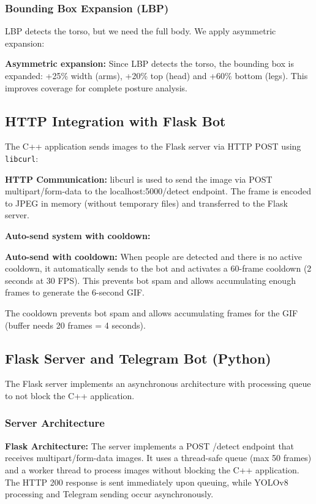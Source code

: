 \documentclass[conference]{IEEEtran}
\begin{document}
\subsubsection{Bounding Box Expansion (LBP)}

LBP detects the torso, but we need the full body. We apply asymmetric expansion:

\textbf{Asymmetric expansion:} Since LBP detects the torso, the bounding box is expanded: +25\% width (arms), +20\% top (head) and +60\% bottom (legs). This improves coverage for complete posture analysis.

\subsection{HTTP Integration with Flask Bot}

The C++ application sends images to the Flask server via HTTP POST using \texttt{libcurl}:

\textbf{HTTP Communication:} libcurl is used to send the image via POST multipart/form-data to the localhost:5000/detect endpoint. The frame is encoded to JPEG in memory (without temporary files) and transferred to the Flask server.

\textbf{Auto-send system with cooldown:}

\textbf{Auto-send with cooldown:} When people are detected and there is no active cooldown, it automatically sends to the bot and activates a 60-frame cooldown (2 seconds at 30 FPS). This prevents bot spam and allows accumulating enough frames to generate the 6-second GIF.

The cooldown prevents bot spam and allows accumulating frames for the GIF (buffer needs 20 frames = 4 seconds).

\subsection{Flask Server and Telegram Bot (Python)}

The Flask server implements an asynchronous architecture with processing queue to not block the C++ application.

\subsubsection{Server Architecture}

\textbf{Flask Architecture:} The server implements a POST /detect endpoint that receives multipart/form-data images. It uses a thread-safe queue (max 50 frames) and a worker thread to process images without blocking the C++ application. The HTTP 200 response is sent immediately upon queuing, while YOLOv8 processing and Telegram sending occur asynchronously.
\end{document}
